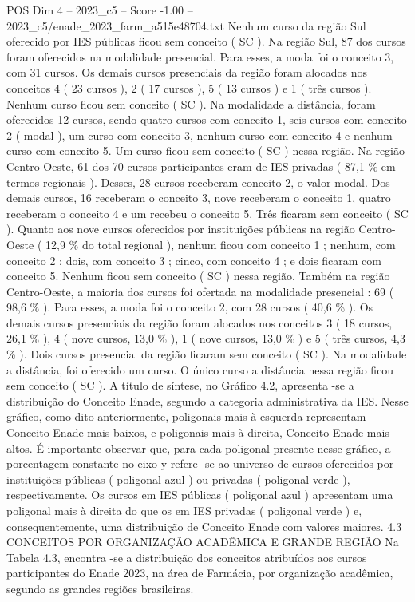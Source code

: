 \begin{textsample}{POS Dim 4 – 2023\_c5 – Score -1.00 – 2023\_c5/enade\_2023\_farm\_a515e48704.txt}
Nenhum curso da região Sul oferecido por IES públicas ficou sem conceito ( SC ).
Na região Sul, 87 dos cursos foram oferecidos na modalidade presencial.
Para esses, a moda foi o conceito 3, com 31 cursos.
Os demais cursos presenciais da região foram alocados nos conceitos 4 ( 23 cursos ), 2 ( 17 cursos ), 5 ( 13 cursos ) e 1 ( três cursos ).
Nenhum curso ficou sem conceito ( SC ).
Na modalidade a distância, foram oferecidos 12 cursos, sendo quatro cursos com conceito 1, seis cursos com conceito 2 ( modal ), um curso com conceito 3, nenhum curso com conceito 4 e nenhum curso com conceito 5.
Um curso ficou sem conceito ( SC ) nessa região.
Na região Centro-Oeste, 61 dos 70 cursos participantes eram de IES privadas ( 87,1 \% em termos regionais ).
Desses, 28 cursos receberam conceito 2, o valor modal.
Dos demais cursos, 16 receberam o conceito 3, nove receberam o conceito 1, quatro receberam o conceito 4 e um recebeu o conceito 5.
Três ficaram sem conceito ( SC ).
Quanto aos nove cursos oferecidos por instituições públicas na região Centro-Oeste ( 12,9 \% do total regional ), nenhum ficou com conceito 1 ; nenhum, com conceito 2 ; dois, com conceito 3 ; cinco, com conceito 4 ; e dois ficaram com conceito 5.
Nenhum ficou sem conceito ( SC ) nessa região.
Também na região Centro-Oeste, a maioria dos cursos foi ofertada na modalidade presencial : 69 ( 98,6 \% ).
Para esses, a moda foi o conceito 2, com 28 cursos ( 40,6 \% ).
Os demais cursos presenciais da região foram alocados nos conceitos 3 ( 18 cursos, 26,1 \% ), 4 ( nove cursos, 13,0 \% ), 1 ( nove cursos, 13,0 \% ) e 5 ( três cursos, 4,3 \% ).
Dois cursos presencial da região ficaram sem conceito ( SC ).
Na modalidade a distância, foi oferecido um curso.
O único curso a distância nessa região ficou sem conceito ( SC ).
A título de síntese, no Gráfico 4.2, apresenta -se a distribuição do Conceito Enade, segundo a categoria administrativa da IES.
Nesse gráfico, como dito anteriormente, poligonais mais à esquerda representam Conceito Enade mais baixos, e poligonais mais à direita, Conceito Enade mais altos.
É importante observar que, para cada poligonal presente nesse gráfico, a porcentagem constante no eixo y refere -se ao universo de cursos oferecidos por instituições públicas ( poligonal azul ) ou privadas ( poligonal verde ), respectivamente.
Os cursos em IES públicas ( poligonal azul ) apresentam uma poligonal mais à direita do que os em IES privadas ( poligonal verde ) e, consequentemente, uma distribuição de Conceito Enade com valores maiores. 4.3 CONCEITOS POR ORGANIZAÇÃO ACADÊMICA E GRANDE REGIÃO Na Tabela 4.3, encontra -se a distribuição dos conceitos atribuídos aos cursos participantes do Enade 2023, na área de Farmácia, por organização acadêmica, segundo as grandes regiões brasileiras.

\end{textsample}
